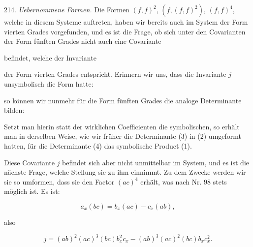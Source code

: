
214. \textit{Uebernommene Formen.} Die Formen $(f, f)^2$, $(f, (f, f)^2)$,
$(f, f)^4$, welche in diesem Systeme auftreten, haben wir bereits auch
im System der Form vierten Grades vorgefunden, und es ist die Frage,
ob sich unter den Covarianten der Form fünften Grades nicht auch
eine Covariante


befindet, welche der Invariante


der Form vierten Grades entspricht. Erinnern wir uns, dass die
Invariante $j$ unsymbolisch die Form hatte:


so können wir nunmehr für die Form fünften Grades die analoge
Determinante bilden:


Setzt man hierin statt der wirklichen Coefficienten die symbolischen,
so erhält man in derselben Weise, wie wir früher die Determinante
(3) in (2) umgeformt hatten, für die Determinante (4) das symbolische
Product (1).

Diese Covariante $j$ befindet sich aber nicht unmittelbar im
System, und es ist die nächste Frage, welche Stellung sie zu ihm
einnimmt. Zu dem Zwecke werden wir sie so umformen, dass sie
den Factor $(ac)^4$ erhält, was nach Nr. 98 stets möglich ist. Es ist:

\[ a_x (bc) = b_x (ac) - c_x (ab), \]

also

\[ j = (ab)^2 (ac)^3 (bc) b_x^2 c_x - (ab)^3 (ac)^2 (bc) b_x c_x^2. \]

